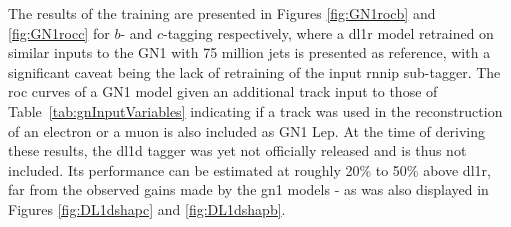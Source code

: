 The results of the training are presented in Figures \ref{fig:GN1rocb} and \ref{fig:GN1rocc} for $b$- and $c$-tagging respectively, where a \gls{dl1r} model retrained on similar inputs to the GN1 with 75 million jets is presented as reference, with a significant caveat being the lack of retraining of the input \gls{rnnip} sub-tagger. The \gls{roc} curves of a GN1 model given an additional track input to those of Table~\ref{tab:gnInputVariables} indicating if a track was used in the reconstruction of an electron or a muon is also included as GN1 Lep. At the time of deriving these results, the \gls{dl1d} tagger was yet not officially released and is thus not included. Its performance can be estimated at roughly 20\% to 50\% above \gls{dl1r}, far from the observed gains made by the \gls{gn1} models - as was also displayed in Figures \ref{fig:DL1dshapc} and \ref{fig:DL1dshapb}. 

